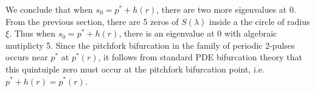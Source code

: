 \documentclass[thesis.tex]{subfiles}
\begin{document}
We conclude that when $s_0 = p^* + h(r)$, there are two more eigenvalues at 0. From the previous section, there are 5 zeros of $S(\lambda)$ inside a the circle of radius $\xi$. Thus when $s_0 = p^* + h(r)$, there is an eigenvalue at 0 with algebraic mutiplicty 5. Since the pitchfork bifurcation in the family of periodic 2-pulses occurs near $p^*$ at $p^*(r)$, it follows from standard PDE bifurcation theory that this quintuiple zero must occur at the pitchfork bifurcation point, i.e. $p^* + h(r) = p^*(r)$.

\iffulldocument\else
	
	
\fi
\end{document}
